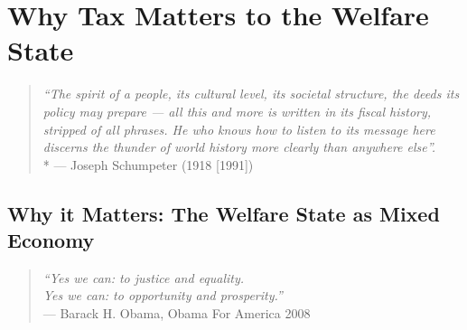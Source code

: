 
\chapter[Tax Matters]{Why Tax Matters to the Welfare State} \label{chap:tax-matters}

\begin{quote}
	\emph{``The spirit of a people, its cultural level, its societal structure, the deeds its policy may prepare --- all this and more is written in its fiscal history, stripped of all phrases. He who knows how to listen to its message here discerns the thunder of world history more clearly than anywhere else''.}\\*
	--- Joseph Schumpeter (1918 [1991])
\end{quote}




\section{Why it Matters: The Welfare State as Mixed Economy} \label{sec:why-mixed-economy-matters}

\begin{quote}
	\emph{``Yes we can: to justice and equality.\\ Yes we can: to opportunity and prosperity.''\\}
	--- Barack H. Obama, Obama For America 2008
\end{quote} %



